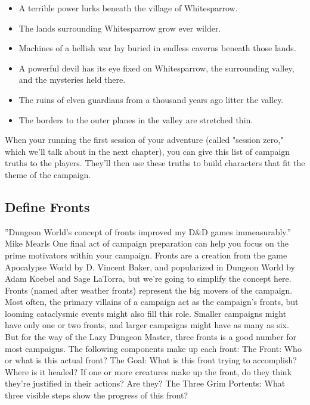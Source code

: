 \documentclass[10pt,a4paper,twoside,bg=print,twocolumn,openany,nodeprecatedcode]{dndbook}
\begin{document}
\begin{itemize}
\item A terrible power lurks beneath the village of Whitesparrow.
\item The lands surrounding Whitesparrow grow ever wilder.
\item Machines of a hellish war lay buried in endless caverns beneath those lands.
\item A powerful devil has its eye fixed on Whitesparrow, the surrounding valley, and the mysteries held there.
\item The ruins of elven guardians from a thousand years ago litter the valley.
\item The borders to the outer planes in the valley are stretched thin.
\end{itemize}

When your running the first session of your adventure (called "session zero," which we'll talk about in the next chapter), you can give this list of campaign truths to the players. They'll then use these truths to build characters that fit the theme of the campaign.
\subsection{Define Fronts}
\DndQuote%
{}
{''Dungeon World's concept of fronts improved my D\&D games immeasurably.''}
{Mike Mearls}
One final act of campaign preparation can help you focus on the prime motivators within your campaign. Fronts are a creation from the game Apocalypse World by D. Vincent Baker, and popularized in Dungeon World by Adam Koebel and Sage LaTorra, but we're going to simplify the concept here.
Fronts (named after weather fronts) represent the big movers of the campaign. Most often, the primary villains of a campaign act as the campaign's fronts, but looming cataclysmic events might also fill this role. Smaller campaigns might have only one or two fronts, and larger campaigns might have as many as six. But for the way of the Lazy Dungeon Master, three fronts is a good number for most campaigns.
The following components make up each front:
The Front: Who or what is this actual front?
The Goal: What is this front trying to accomplish? Where is it headed? If one or more creatures make up the front, do they think they're justified in their actions? Are they?
The Three Grim Portents: What three visible steps show the progress of this front?
\end{document}
